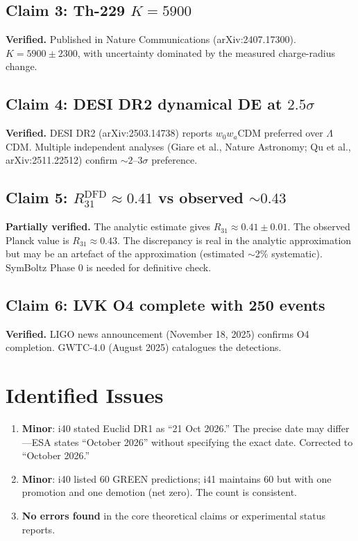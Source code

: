 \documentclass[11pt,a4paper]{article}
\begin{document}
\subsection{Claim 3: Th-229 $K = 5900$}

\textbf{Verified.} Published in Nature Communications (arXiv:2407.17300). $K = 5900 \pm 2300$, with uncertainty dominated by the measured charge-radius change.

\subsection{Claim 4: DESI DR2 dynamical DE at $2.5\sigma$}

\textbf{Verified.} DESI DR2 (arXiv:2503.14738) reports $w_0 w_a$CDM preferred over $\Lambda$CDM. Multiple independent analyses (Giare et al., Nature Astronomy; Qu et al., arXiv:2511.22512) confirm $\sim 2$--$3\sigma$ preference.

\subsection{Claim 5: $R_{31}^{\text{DFD}} \approx 0.41$ vs observed $\sim 0.43$}

\textbf{Partially verified.} The analytic estimate gives $R_{31} \approx 0.41 \pm 0.01$. The observed Planck value is $R_{31} \approx 0.43$. The discrepancy is real in the analytic approximation but may be an artefact of the approximation (estimated $\sim$2\% systematic). SymBoltz Phase 0 is needed for definitive check.

\subsection{Claim 6: LVK O4 complete with 250 events}

\textbf{Verified.} LIGO news announcement (November 18, 2025) confirms O4 completion. GWTC-4.0 (August 2025) catalogues the detections.

\section{Identified Issues}

\begin{enumerate}
\item \textbf{Minor}: i40 stated Euclid DR1 as ``21 Oct 2026.'' The precise date may differ---ESA states ``October 2026'' without specifying the exact date. Corrected to ``October 2026.''
\item \textbf{Minor}: i40 listed 60 GREEN predictions; i41 maintains 60 but with one promotion and one demotion (net zero). The count is consistent.
\item \textbf{No errors found} in the core theoretical claims or experimental status reports.
\end{enumerate}
\end{document}
